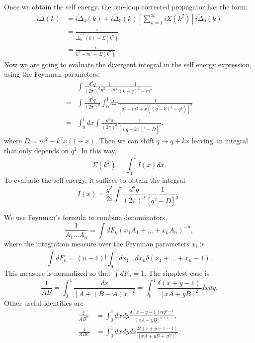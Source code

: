 Once we obtain the self energy, the one-loop corrected propagator has the form:
\begin{equation}
\begin{aligned}
	i\tilde{\Delta}(k) 
	&= i\tilde{\Delta}_0(k) + i\tilde{\Delta}_0(k)\left[\sum_{n=1}^{\infty}i\Sigma(k^2)\right]i\tilde{\Delta}_0(k) \\
	&= \frac{i}{\tilde{\Delta}^{-1}_0(k) - \Sigma(k^2)} \\
	&= \frac{i}{k^2-m^2-\Sigma(k^2)}.
\end{aligned}
\end{equation}
Now we are going to evaluate the divergent integral in the self energy expression, using the Feynman parameters:
\begin{equation*}
\begin{aligned}
&\int \frac{d^d q}{(2 \pi)^d} \frac{1}{q^{2}-m^2} \frac{1}{(k-q)^{2}-m^2} \\
=&\int \frac{d^d q}{(2 \pi)^d} \int_{0}^{1} d x \frac{1}{\left[q^{2}-m^2+x\left((q-k)^{2}-q^{2}\right)\right]^{2}} \\
=&\int_{0}^{1} d x \int \frac{d^d q}{(2 \pi)^d} \frac{1}{\left[(q-kx)^{2}-D\right]^{2}},
\end{aligned}
\end{equation*}
where $D=m^2-k^{2} x(1-x)$. Then we can shift $q \rightarrow q+kx$ leaving an integral that only depends on $q^{2}$. In this way,
\begin{equation*}
\Sigma(k^2) = \int_0^1 I(x)dx.
\end{equation*}
To evaluate the self-energy, it suffices to obtain the integral
\begin{equation*}
I(x) = \frac{g^2}{2i}\int \frac{d^d q}{(2 \pi)^d} \frac{1}{\left[q^{2}-D\right]^{2}}.
\end{equation*}

\begin{framedrmk}
We use Feynman's formula to combine denominators,
\begin{equation}
\frac{1}{A_{1} \ldots A_{n}}=\int d F_{n}\left(x_{1} A_{1}+\ldots+x_{n} A_{n}\right)^{-n},
\end{equation}
where the integration measure over the Feynman parameters $x_{i}$ is
\begin{equation}
\int d F_{n}=(n-1) ! \int_{0}^{1} d x_{1} \ldots d x_{n} \delta\left(x_{1}+\ldots+x_{n}-1\right).
\end{equation}
This measure is normalized so that $\int d F_{n} =1$. 
The simplest case is
\begin{equation}
\frac{1}{A B}=\int_{0}^{1} \frac{dx}{[A+(B-A) x]^{2}}
=\int_{0}^{1} \frac{\delta(x+y-1)}{[x A+y B]^{2}} dx dy.
\end{equation}
Other useful identities are
\begin{equation}
\begin{aligned}
\frac{1}{A B^{n}} &=\int_{0}^{1} dxdy\frac{\delta(x+y-1)n y^{n-1}}{[x A+y B]^{n+1}} , \\
\frac{1}{A B C} &=\int_{0}^{1} dxdydz \frac{2\delta(x+y+z-1)}{[x A+y B+z C]^{3}} .
\end{aligned}
\end{equation}
\end{framedrmk}


